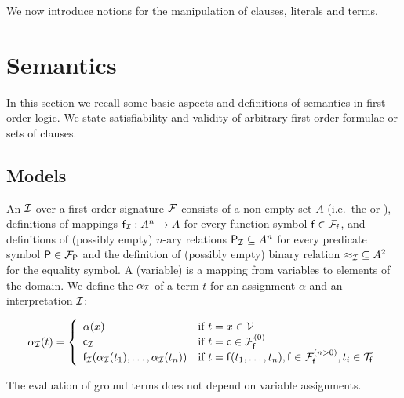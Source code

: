 We now introduce notions for the manipulation
of clauses, literals and terms.









\section{Semantics}\label{sec:semantics}

In this section we recall some basic aspects and definitions of semantics in first order logic.
We state satisfiability and validity of arbitrary first order formulae or sets of clauses.

\subsection{Models}

\begin{definition}\label{def:interpretation}
	An  \( \mcI \)
	over a first order signature \( \mcF \) consists of a
	non-empty set \( A \)
	(i.e.\ the  or ),
%
	definitions of mappings
	\( \mf_\mcI: A^n\rightarrow A \)
	for every function symbol \( \mf\in\mcFf \),
	and definitions of (possibly empty) \(n\)-ary relations
	 \( {\mP_\mcI}\subseteq A^n \) for every predicate symbol \( \mP\in\mcFP \)
	 and the definition of (possibly empty) binary relation \( {\mEQ_\mcI}\subseteq A^2 \) for the equality symbol.
%
	 A (variable)  is a mapping from variables to elements of the domain.
%
	 We define the  \( \alpha_\mcI \) of a term \( t \)
	 for an assignment \( \alpha \) and an interpretation \( \mcI \):

	 \begin{gather*}
	 \MDEFINE{\alpha_\mcI(t)
	 }{ll}{
	 	\alpha(x)
	 	&\text{if }t=x\in\mcV \\
	 	\mc_\mcI
	 	&\text{if }t=\mc\in\mcFfn[0]
	 	\\
	 	\mf_\mcI (\alpha_\mcI(t_1),\ldots,\alpha_\mcI(t_n))
	 	&\text{if }t=\mf(t_1,\ldots,t_n), \mf\in\mcFfn[n>0], t_i\in\mcTf
 }
	 \end{gather*}

\end{definition}
\begin{remark}
	The evaluation of ground terms does not depend on variable assignments.
\end{remark}


